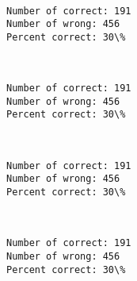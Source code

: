 \documentclass[11pt]{article}
\begin{document}
    \begin{center}
    \end{center}
    { \hspace*{\fill} \\}
    
    \begin{Verbatim}[commandchars=\\\{\}]
Number of correct: 191
Number of wrong: 456
Percent correct: 30\%

    \end{Verbatim}

    \begin{center}
    \end{center}
    { \hspace*{\fill} \\}
    
    \begin{Verbatim}[commandchars=\\\{\}]
Number of correct: 191
Number of wrong: 456
Percent correct: 30\%

    \end{Verbatim}

    \begin{center}
    \end{center}
    { \hspace*{\fill} \\}
    
    \begin{Verbatim}[commandchars=\\\{\}]
Number of correct: 191
Number of wrong: 456
Percent correct: 30\%

    \end{Verbatim}

    \begin{center}
    \end{center}
    { \hspace*{\fill} \\}
    
    \begin{Verbatim}[commandchars=\\\{\}]
Number of correct: 191
Number of wrong: 456
Percent correct: 30\%

    \end{Verbatim}
\end{document}
